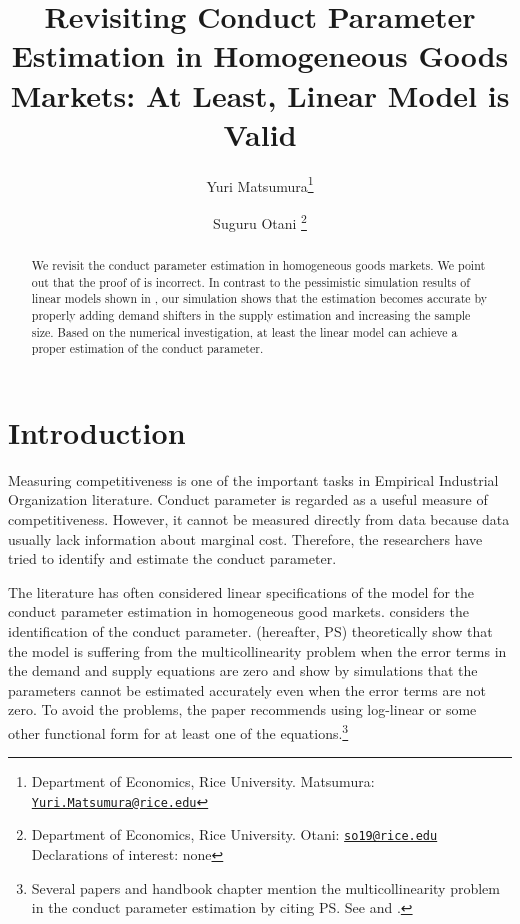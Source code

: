 \documentclass[11pt, a4paper]{article}
\title{Revisiting Conduct Parameter Estimation in Homogeneous Goods Markets: At Least, Linear Model is Valid}
\author{Yuri Matsumura\footnote{Department of Economics, Rice University. Matsumura: \texttt{\href{mailto:Yuri.Matsumura@rice.edu}{Yuri.Matsumura@rice.edu}}} \and Suguru Otani \footnote{Department of Economics, Rice University. Otani: \texttt{\href{mailto:so19@rice.edu}{so19@rice.edu}}\\
Declarations of interest: none}}
\begin{document}
\maketitle

\begin{abstract}
    We revisit the conduct parameter estimation in homogeneous goods markets.
    We point out that the proof of \cite{perloff2012collinearity} is incorrect.
    In contrast to the pessimistic simulation results of linear models shown in \cite{perloff2012collinearity}, our simulation shows that the estimation becomes accurate by properly adding demand shifters in the supply estimation and increasing the sample size. 
    Based on the numerical investigation, at least the linear model can achieve a proper estimation of the conduct parameter.
\end{abstract}

\section{Introduction}

Measuring competitiveness is one of the important tasks in Empirical Industrial Organization literature.
Conduct parameter is regarded as a useful measure of competitiveness. 
However, it cannot be measured directly from data because data usually lack information about marginal cost.
Therefore, the researchers have tried to identify and estimate the conduct parameter.

The literature has often considered linear specifications of the model for the conduct parameter estimation in homogeneous good markets. 
\citet{bresnahan1982oligopoly} considers the identification of the conduct parameter. 
\citet{perloff2012collinearity} (hereafter, PS) theoretically show that the model is suffering from the multicollinearity problem when the error terms in the demand and supply equations are zero and show by simulations that the parameters cannot be estimated accurately even when the error terms are not zero.
To avoid the problems, the paper recommends using log-linear or some other functional form for at least one of the equations.\footnote{Several papers and handbook chapter mention the multicollinearity problem in the conduct parameter estimation by citing PS. See \citet{claessensWhatDrivesBank2004, coccoreseMultimarketContactCompetition2013, coccoreseWhatAffectsBank2021, garciaMarketStructuresProduction2020, kumbhakarNewMethodEstimating2012, perekhozhukRegionalLevelAnalysisOligopsony2015} and \citet{shafferMarketPowerCompetition2017}.}
\end{document}
